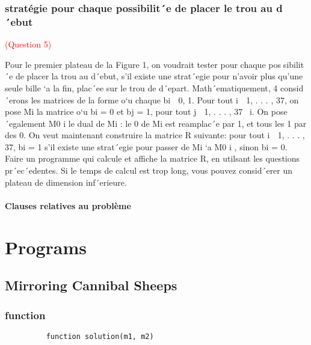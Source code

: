 \documentclass[utf8]{article}
\begin{document}
\subsubsection{stratégie pour chaque possibilit´e de placer le trou au d´ebut}
\textcolor{red}{(Question 5)}

Pour le premier plateau de la Figure 1, on voudrait tester pour chaque possibilit´e de placer la trou au d´ebut, s’il existe une strat´egie pour n’avoir plus
qu’une seule bille `a la fin, plac´ee sur le trou de d´epart. Math´ematiquement,
4
consid´erons les matrices de la forme
o`u chaque bi ∈ {0, 1}. Pour tout i ∈ {1, . . . , 37}, on pose Mi
la matrice
o`u bi = 0 et bj = 1, pour tout j ∈ {1, . . . , 37} \ i. On pose ´egalement M0
i
le dual de Mi
: le 0 de Mi est reamplac´e par 1, et tous les 1 par des 0.
On veut maintenant construire la matrice R suivante: pour tout i ∈
{1, . . . , 37}, bi = 1 s’il existe une strat´egie pour passer de Mi `a M0
i
, sinon
bi = 0. Faire un programme qui calcule et affiche la matrice R, en utilsant
les questions pr´ec´edentes. Si le temps de calcul est trop long, vous pouvez
consid´erer un plateau de dimension inf´erieure.
\paragraph{Clauses relatives au problème}


\newpage

\section{Programs}

\subsection{ Mirroring Cannibal Sheeps }

\subsubsection{function}

\begin{figure}[H]
\begin{minipage}{\textwidth}
  \centering	
	\begin{lstlisting}
	function solution(m1, m2) 
    \end{lstlisting}
  \label{fig:code_exemple}
\end{minipage}
\end{figure}
\end{document}
